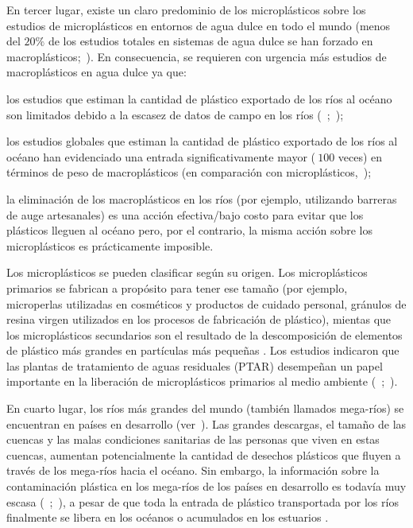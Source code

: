En tercer lugar, existe un claro predominio de los microplásticos sobre los estudios de microplásticos en entornos de agua dulce en todo el mundo (menos del $20\%$ de los estudios totales en sistemas de agua dulce se han forzado en macroplásticos;~\cite{Blettler2017}). En consecuencia, se requieren con urgencia más estudios de macroplásticos en agua dulce ya que:
\begin{enumerate*}[label = \(\roman*)]
	\item los estudios que estiman la cantidad de plástico exportado de los ríos al océano son limitados debido a la escasez de datos de campo en los ríos (~\cite{Lebreton2017};~\cite{Schmidt2017});
	\item los estudios globales que estiman la cantidad de plástico exportado de los ríos al océano han evidenciado una entrada significativamente mayor ($\>100$ veces) en términos de peso de macroplásticos (en comparación con microplásticos,~\cite{Schmidt2017});
	\item la eliminación de los macroplásticos en los ríos (por ejemplo, utilizando barreras de auge artesanales) es una acción efectiva/bajo costo para evitar que los plásticos lleguen al océano pero, por el contrario, la misma acción sobre los microplásticos es prácticamente imposible.
\end{enumerate*}
Los microplásticos se pueden clasificar según su origen. Los microplásticos primarios se fabrican a propósito para tener ese tamaño (por ejemplo, microperlas utilizadas en cosméticos y productos de cuidado personal, gránulos de resina virgen utilizados en los procesos de fabricación de plástico), mientas que los microplásticos secundarios son el resultado de la descomposición de elementos de plástico más grandes en partículas más pequeñas \parencite{Weinstein2016}. Los estudios indicaron que las plantas de tratamiento de aguas residuales (PTAR) desempeñan un papel importante en la liberación de microplásticos primarios al medio ambiente (~\cite{OU2018317};~\cite{GUNDOGDU2018342}).

En cuarto lugar, los ríos más grandes del mundo (también llamados mega-ríos) se encuentran en países en desarrollo (ver~\cite{LATRUBESSE2008130}). Las grandes descargas, el tamaño de las cuencas y las malas condiciones sanitarias de las personas que viven en estas cuencas, aumentan potencialmente la cantidad de desechos plásticos que fluyen a través de los mega-ríos hacia el océano. Sin embargo, la información sobre la contaminación plástica en los mega-ríos de los países en desarrollo es todavía muy escasa (~\cite{PAZOS201785};~\cite{Blettler2017}), a pesar de que toda la entrada de plástico transportada por los ríos finalmente se libera en los océanos \parencite{MORRITT2014196} o acumulados en los estuarios \parencite{VERMEIREN20167}.

